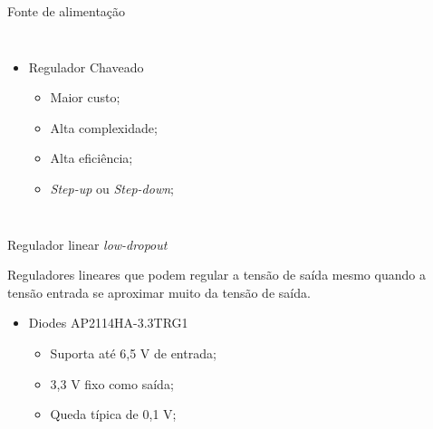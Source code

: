 \begin{frame}[allowframebreaks]{Fonte de alimentação}
\begin{columns}
        
        \begin{itemize}
            \item Regulador Chaveado
            \begin{itemize}
                \item Maior custo;
                \item Alta complexidade;
                \item Alta eficiência;
                \item \textit{Step-up} ou \textit{Step-down};
            \end{itemize}
        \end{itemize}
        
\end{columns}


\framebreak

\begin{block}{Regulador linear \textit{low-dropout}}

Reguladores lineares que podem regular a tensão de saída mesmo quando a tensão entrada se aproximar muito da tensão de saída.

\end{block}

\begin{itemize}
    \item Diodes AP2114HA-3.3TRG1
    \begin{itemize}
        \item Suporta até 6,5 V de entrada;
        \item 3,3 V fixo como saída;
        \item Queda típica de 0,1 V;
    \end{itemize}
\end{itemize}


\end{frame}



